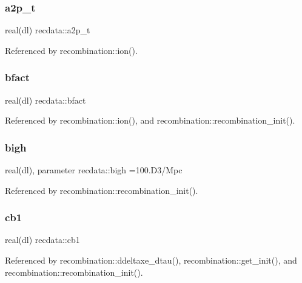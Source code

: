 \subsubsection{\texorpdfstring{a2p\+\_\+t}{a2p\_t}}
{\footnotesize\ttfamily real(dl) recdata\+::a2p\+\_\+t}



Referenced by recombination\+::ion().

\mbox{\label{namespacerecdata_a98e25aebe5900dc1cca84fe8be016dc4}} 
\subsubsection{\texorpdfstring{bfact}{bfact}}
{\footnotesize\ttfamily real(dl) recdata\+::bfact}



Referenced by recombination\+::ion(), and recombination\+::recombination\+\_\+init().

\mbox{\label{namespacerecdata_a6d6695fdf7d29c72eb628457a9d2f8e8}} 
\subsubsection{\texorpdfstring{bigh}{bigh}}
{\footnotesize\ttfamily real(dl), parameter recdata\+::bigh =100.\+D3/\+Mpc}



Referenced by recombination\+::recombination\+\_\+init().

\mbox{\label{namespacerecdata_a7e7a0ff371efd261f699832dc5f2d2a4}} 
\subsubsection{\texorpdfstring{cb1}{cb1}}
{\footnotesize\ttfamily real(dl) recdata\+::cb1}



Referenced by recombination\+::ddeltaxe\+\_\+dtau(), recombination\+::get\+\_\+init(), and recombination\+::recombination\+\_\+init().

\mbox{\label{namespacerecdata_a0632faea1d88dcd7d279c24c08910ed3}} 
